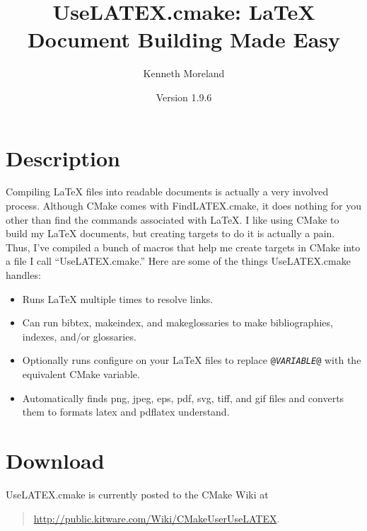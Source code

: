 \documentclass{article}
\newcommand{\UseLATEXVersion}{1.9.6}
\newcommand*{\textfile}[1]{\textsf{#1}}
\newcommand*{\textprog}[1]{\textfile{#1}}
\newcommand*{\textcmake}[1]{\texttt{#1}}
\newcommand*{\textvar}[1]{\textit{#1}}
\newcommand*{\UseLATEX}{\textfile{UseLATEX.cmake}\xspace}
\newcommand*{\latex}{\LaTeX\xspace}
\begin{document}
  \sloppy

  \title{UseLATEX.cmake: \latex Document Building Made Easy}
  \author{Kenneth Moreland}
  \date{Version \UseLATEXVersion}
  \maketitle

  \tableofcontents


  \section{Description}
  \label{sec:Description}

  Compiling \latex files into readable documents is actually a very
  involved process. Although CMake comes with \textfile{FindLATEX.cmake},
  it does nothing for you other than find the commands associated with
  \latex. I like using CMake to build my \latex documents, but creating
  targets to do it is actually a pain. Thus, I've compiled a bunch of
  macros that help me create targets in CMake into a file I call
  ``\UseLATEX.'' Here are some of the things \UseLATEX handles:

  \begin{itemize}
  \item Runs \latex multiple times to resolve links. 
  \item Can run \textprog{bibtex}, \textprog{makeindex}, and
    \textprog{makeglossaries} to make bibliographies, indexes, and/or
    glossaries.
  \item Optionally runs configure on your \latex files to replace
    \textcmake{@\textvar{VARIABLE}@} with the equivalent CMake variable.
  \item Automatically finds png, jpeg, eps, pdf, svg, tiff, and gif files
    and converts them to formats \textprog{latex} and \textprog{pdflatex}
    understand.
  \end{itemize}


  \section{Download}
  \label{sec:Download}

  \UseLATEX is currently posted to the CMake Wiki at
  \begin{quote}
    \href{http://public.kitware.com/Wiki/CMakeUserUseLATEX}{http://public.kitware.com/Wiki/CMakeUserUseLATEX}.
  \end{quote}
\end{document}
